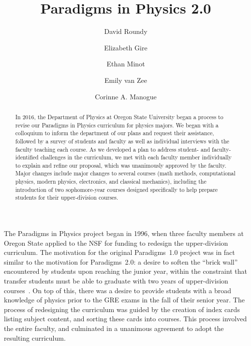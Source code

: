 \documentclass[english,aps,pra,reprint,noshowpacs,superscriptaddress]{revtex4-1}
\newcommand\davidsays[1]{\textcolor{blue}{[\sc DR: {\em#1}]}}
\renewcommand\davidsays[1]{}
\begin{document}
\title{Paradigms in Physics 2.0}
\author{David Roundy}
\author{Elizabeth Gire}
\author{Ethan Minot}
\author{Emily van Zee}
\author{Corinne A. Manogue}


\begin{abstract}
In 2016, the Department of Physics at Oregon State University began a
process to revise our Paradigms in Physics curriculum for physics
majors.  We began with a colloquium to inform the department of our
plans and request their assistance, followed by a
survey of students and faculty as well as individual interviews with
the faculty teaching each course.  As we developed a plan to
address student- and faculty-identified challenges in the curriculum,
we met with each faculty member individually to explain and refine our
proposal, which was unanimously approved by the faculty.  Major
changes include major changes to several courses (math
methods, computational physics, modern physics, electronics, and
classical mechanics), including the introduction of two sophomore-year
courses designed specifically to help prepare students for their
upper-division courses.
\end{abstract}

\maketitle
%
The Paradigms in Physics project began in 1996, when three faculty
members at Oregon State applied to the NSF for funding to redesign the
upper-division curriculum.  The motivation for the original Paradigms~1.0
project was in fact similar to the motivation for Paradigms~2.0: a
desire to soften the ``brick wall'' encountered by students upon
reaching the junior year, within the constraint that transfer students
must be able to graduate with two years of upper-division
courses~\cite{manogue2001paradigms}.  On top of this, there was a
desire to provide students with a broad knowledge of physics prior to
the GRE exams in the fall of their senior year.  The process of
redesigning the curriculum was guided by the creation of index cards
listing subject content, and sorting these cards into courses.  This
process involved the entire faculty, and culminated in a unanimous
agreement to adopt the resulting curriculum.
\end{document}
